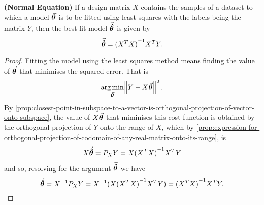 \documentclass[../MathsNotesBase.tex]{subfiles}
\begin{document}
{	\bigskip
	\begin{corollary}\label{coro:normal-equation}
		\textbf{(Normal Equation)} If a design matrix $X$ contains the samples of a dataset to which a model $\vec{\bm{\theta}}$ is to be fitted using least squares with the labels being the matrix $Y$, then the best fit model ${ \vec{\bm{\hat\theta}} }$ is given by
			\[ \vec{\bm{\hat\theta}} = {(X^T X)}^{-1} X^T Y. \]
	\end{corollary}
	\begin{proof}
		Fitting the model using the least squares method means finding the value of $\vec{\bm{\theta}}$ that minimises the squared error. That is
		\[ \operatorname*{arg\,min}_{\vec{\bm{\theta}}} \norm{Y - X\vec{\bm{\theta}}}^2. \]
		By \autoref{prop:closest-point-in-subspace-to-a-vector-is-orthogonal-projection-of-vector-onto-subspace}, the value of $X\vec{\bm{\theta}}$ that miminises this cost function is obtained by the orthogonal projection of $Y$ onto the range of $X$, which by \autoref{prop:expression-for-orthogonal-projection-of-codomain-of-any-real-matrix-onto-its-range}, is 
		\[ X\vec{\bm{\hat\theta}} = P_X Y = X {(X^T X)}^{-1} X^T Y \]
		and so, resolving for the argument $\vec{\bm{\hat\theta}}$ we have
		\[ \vec{\bm{\hat\theta}} = {X}^{-1} P_X Y = {X}^{-1} (X {(X^T X)}^{-1} X^T Y) = {(X^T X)}^{-1} X^T Y.   \qedhere \]
	\end{proof}


}
\end{document}

